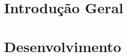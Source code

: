 \documentclass[
	12pt,				 %
	oneside,			 %
	a4paper,			 %
	chapter=TITLE,		 %
	section=TITLE,		 %
	sumario=tradicional, %
	english,			 %
	brazil				 %
	]{abntex2}
\begin{document}
\newcommand{\makeboxlabel}[1]{\fbox{#1.}\hfill}%
\newenvironment{boxlabel}
  {\begin{list}
    {\arabic{boxlblcounter}}
    {\usecounter{boxlblcounter}
     \setlength{\labelwidth}{3em}
     \setlength{\labelsep}{0em}
     \setlength{\itemsep}{2pt}
     \setlength{\leftmargin}{1.5cm}
     \setlength{\rightmargin}{2cm}
     \setlength{\itemindent}{0em} 
     \let\makelabel=\makeboxlabel
    }
  }
{\end{list}}

\frenchspacing

\imprimircapa
\part{Introdução Geral}

\part{Desenvolvimento}




% 


\printindex
\end{document}
